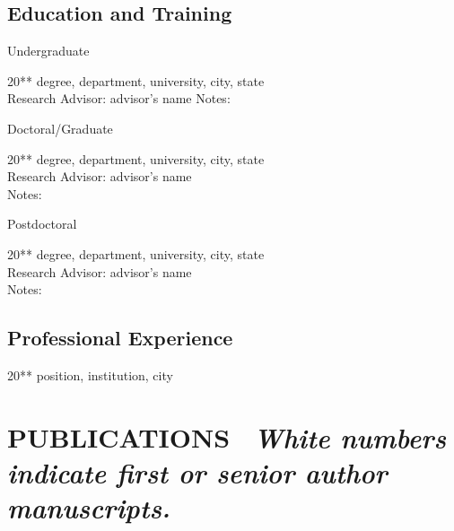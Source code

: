 \documentclass[11pt]{article}
\newenvironment{lyxlist}[1]
	{\begin{list}{}
		{\setlength\itemsep{-0.5ex}
		\settowidth{\labelwidth}{#1}
		 \setlength{\leftmargin}{\labelwidth}
		 \addtolength{\leftmargin}{\labelsep}
		 \renewcommand{\makelabel}[1]{##1\hfil}}}
	{\end{list}}
\begin{document}
\subsection*{Education and Training}
\begin{lyxlist}{0000-present}
\item[{\textcolor{color1}{Undergraduate}}]
\item [{{20{*}{*}\textendash 20{*}{*}}}]degree, department, university, city, state\\
Research Advisor: advisor's name
Notes:
\item[{\textcolor{color1}{Doctoral/Graduate}}]
\item [{{20{*}{*}\textendash 20{*}{*}}}]degree, department, university, city, state\\
Research Advisor: advisor's name\\
Notes:
\item[{\textcolor{color1}{Postdoctoral}}]
\item [{{20{*}{*}\textendash 20{*}{*}}}]degree, department, university, city, state\\
Research Advisor: advisor's name\\
Notes:
\end{lyxlist}

\subsection*{Professional Experience}

\begin{lyxlist}{0000-present}
\item [{20{*}{*}\textendash 20{*}{*}}]position, institution, city

\end{lyxlist}

\section*{PUBLICATIONS \ {\small \em  White numbers indicate first or senior author manuscripts.}}

\end{document}
